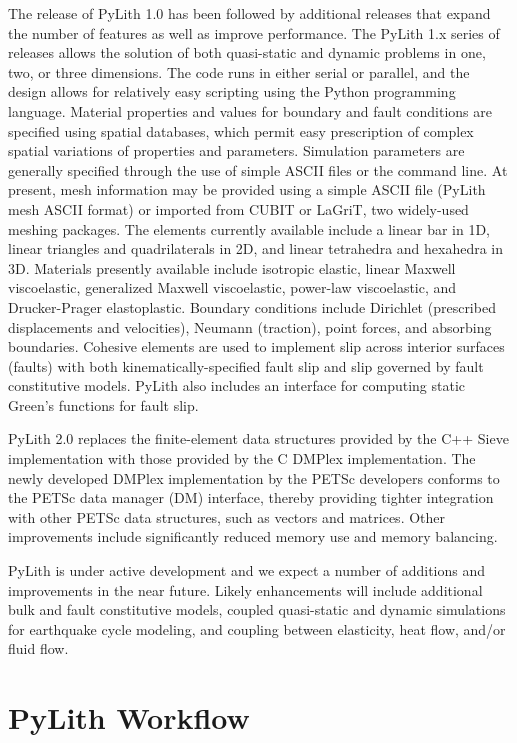The release of PyLith 1.0 has been followed by additional releases
that expand the number of features as well as improve performance.
The PyLith 1.x series of releases allows the solution of both quasi-static
and dynamic problems in one, two, or three dimensions. The code runs
in either serial or parallel, and the design allows for relatively
easy scripting using the Python programming language. Material properties
and values for boundary and fault conditions are specified using spatial
databases, which permit easy prescription of complex spatial variations
of properties and parameters. Simulation parameters are generally
specified through the use of simple ASCII files or the command line.
At present, mesh information may be provided using a simple ASCII
file (PyLith mesh ASCII format) or imported from CUBIT or LaGriT,
two widely-used meshing packages. The elements currently available
include a linear bar in 1D, linear triangles and quadrilaterals in
2D, and linear tetrahedra and hexahedra in 3D. Materials presently
available include isotropic elastic, linear Maxwell viscoelastic,
generalized Maxwell viscoelastic, power-law viscoelastic, and Drucker-Prager
elastoplastic. Boundary conditions include Dirichlet (prescribed displacements
and velocities), Neumann (traction), point forces, and absorbing boundaries.
Cohesive elements are used to implement slip across interior surfaces
(faults) with both kinematically-specified fault slip and slip governed
by fault constitutive models. PyLith also includes an interface for
computing static Green's functions for fault slip.

PyLith 2.0 replaces the finite-element data structures provided by
the C++ Sieve implementation with those provided by the C DMPlex implementation.
The newly developed DMPlex implementation by the PETSc developers
conforms to the PETSc data manager (DM) interface, thereby providing
tighter integration with other PETSc data structures, such as vectors
and matrices. Other improvements include significantly reduced memory
use and memory balancing.

PyLith is under active development and we expect a number of additions
and improvements in the near future. Likely enhancements will include
additional bulk and fault constitutive models, coupled quasi-static
and dynamic simulations for earthquake cycle modeling, and coupling
between elasticity, heat flow, and/or fluid flow.


\section{PyLith Workflow}

